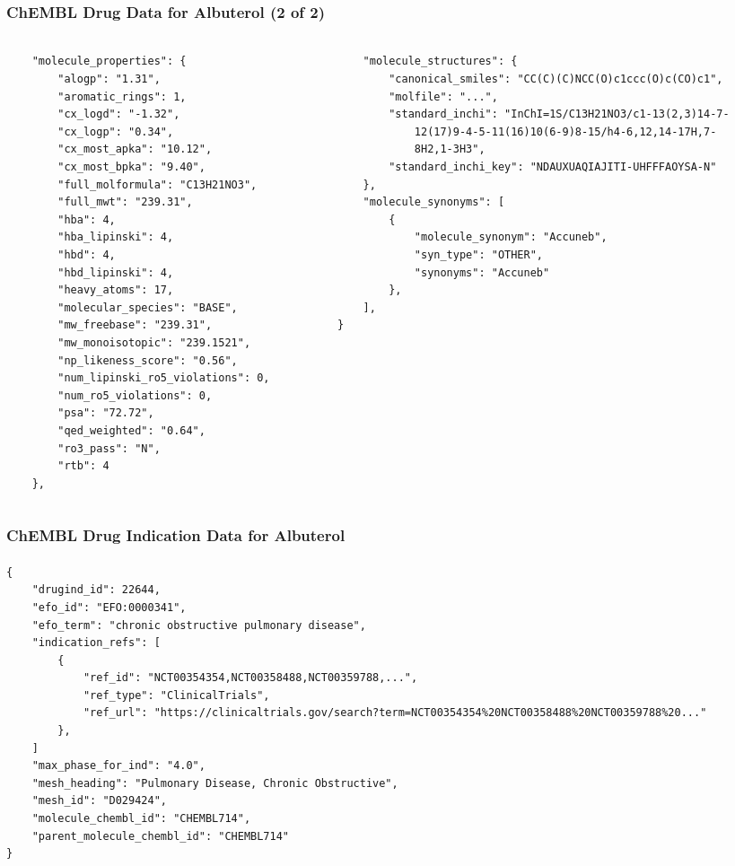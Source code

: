 \documentclass[aspectratio=169,xcolor=dvipsnames]{beamer}
\begin{document}
\begin{frame}[fragile,t]
  \frametitle{ChEMBL Drug Data for Albuterol (2 of 2)}
  \framesubtitle{}
  \tiny
  \begin{columns}[t]
    \begin{column}{0.5\textwidth}
\begin{verbatim}
    "molecule_properties": {
        "alogp": "1.31",
        "aromatic_rings": 1,
        "cx_logd": "-1.32",
        "cx_logp": "0.34",
        "cx_most_apka": "10.12",
        "cx_most_bpka": "9.40",
        "full_molformula": "C13H21NO3",
        "full_mwt": "239.31",
        "hba": 4,
        "hba_lipinski": 4,
        "hbd": 4,
        "hbd_lipinski": 4,
        "heavy_atoms": 17,
        "molecular_species": "BASE",
        "mw_freebase": "239.31",
        "mw_monoisotopic": "239.1521",
        "np_likeness_score": "0.56",
        "num_lipinski_ro5_violations": 0,
        "num_ro5_violations": 0,
        "psa": "72.72",
        "qed_weighted": "0.64",
        "ro3_pass": "N",
        "rtb": 4
    },
\end{verbatim}
    \end{column}
    \begin{column}{0.5\textwidth}
\begin{verbatim}
    "molecule_structures": {
        "canonical_smiles": "CC(C)(C)NCC(O)c1ccc(O)c(CO)c1",
        "molfile": "...",
        "standard_inchi": "InChI=1S/C13H21NO3/c1-13(2,3)14-7-
            12(17)9-4-5-11(16)10(6-9)8-15/h4-6,12,14-17H,7-
            8H2,1-3H3",
        "standard_inchi_key": "NDAUXUAQIAJITI-UHFFFAOYSA-N"
    },
    "molecule_synonyms": [
        {
            "molecule_synonym": "Accuneb",
            "syn_type": "OTHER",
            "synonyms": "Accuneb"
        },
    ],
}
\end{verbatim}
    \end{column}
  \end{columns}
\end{frame}

\begin{frame}[fragile,t]
  \frametitle{ChEMBL Drug Indication Data for Albuterol}
  \framesubtitle{}
  \tiny
\begin{verbatim}
{
    "drugind_id": 22644,
    "efo_id": "EFO:0000341",
    "efo_term": "chronic obstructive pulmonary disease",
    "indication_refs": [
        {
            "ref_id": "NCT00354354,NCT00358488,NCT00359788,...",
            "ref_type": "ClinicalTrials",
            "ref_url": "https://clinicaltrials.gov/search?term=NCT00354354%20NCT00358488%20NCT00359788%20..."
        },
    ]
    "max_phase_for_ind": "4.0",
    "mesh_heading": "Pulmonary Disease, Chronic Obstructive",
    "mesh_id": "D029424",
    "molecule_chembl_id": "CHEMBL714",
    "parent_molecule_chembl_id": "CHEMBL714"
}
\end{verbatim}
\end{frame}
\end{document}
